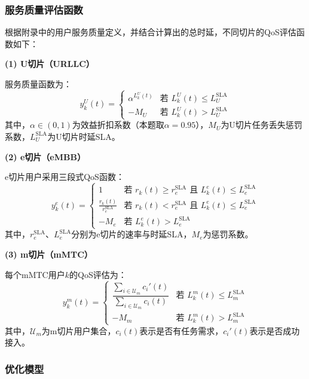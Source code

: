 \subsubsection{服务质量评估函数}

根据附录中的用户服务质量定义，并结合计算出的总时延，不同切片的QoS评估函数如下：

\textbf{(1) U切片（URLLC）}

服务质量函数为：
\begin{equation}
y_k^{U}(t) = \begin{cases}
\alpha^{L_k^{U}(t)} & \text{若 } L_k^{U}(t) \leq L_{U}^{\text{SLA}} \\
-M_{U} & \text{若 } L_k^{U}(t) > L_{U}^{\text{SLA}}
\end{cases}
\end{equation}
其中，$\alpha\in(0,1)$为效益折扣系数（本题取$\alpha=0.95$），$M_U$为U切片任务丢失惩罚系数，$L_U^{\text{SLA}}$为U切片时延SLA。

\textbf{(2) e切片（eMBB）}

e切片用户采用三段式QoS函数：
\begin{equation}
y_k^{e}(t) = \begin{cases}
1 & \text{若 } r_k(t) \geq r_{e}^{\text{SLA}} \text{ 且 } L_k^{e}(t) \leq L_{e}^{\text{SLA}} \\
\frac{r_k(t)}{r_{e}^{\text{SLA}}} & \text{若 } r_k(t) < r_{e}^{\text{SLA}} \text{ 且 } L_k^{e}(t) \leq L_{e}^{\text{SLA}} \\
-M_{e} & \text{若 } L_k^{e}(t) > L_{e}^{\text{SLA}}
\end{cases}
\end{equation}
其中，$r_e^{\text{SLA}}$、$L_e^{\text{SLA}}$分别为e切片的速率与时延SLA，$M_e$为惩罚系数。

\textbf{(3) m切片（mMTC）}

每个mMTC用户$k$的QoS评估为：
\begin{equation}
y_k^{m}(t) = \begin{cases}
\dfrac{\sum_{i \in \mathcal{U}_{m}} c_i'(t)}{\sum_{i \in \mathcal{U}_{m}} c_i(t)} & \text{若 } L_k^{m}(t) \le L_{m}^{\text{SLA}} \\
-M_{m} & \text{若 } L_k^{m}(t) > L_{m}^{\text{SLA}}
\end{cases}
\end{equation}
其中，$\mathcal{U}_m$为m切片用户集合，$c_i(t)$表示是否有任务需求，$c_i'(t)$表示是否成功接入。

\subsubsection{优化模型}

